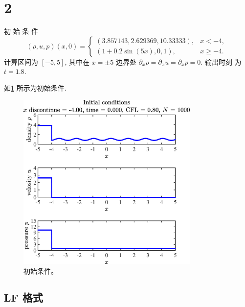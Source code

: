 \documentclass[12pt]{article}
\begin{document}
\section{2}

初 始 条 件
\begin{equation}
	(\rho, u, p)(x, 0)=\left\{\begin{array}{ll}
		(3.857143,2.629369,10.33333), & x<-4,     \\
		(1+0.2 \sin (5 x), 0,1),      & x \geq-4.
	\end{array}\right.
\end{equation}
计算区间为 $[-5,5]$, 其中在 $x=\pm 5$ 边界处 $\partial_{x} \rho=\partial_{x} u=\partial_{x} p=0 .$ 输出时刻 为 $t=1.8$.

如\cref{fig:4ini} 所示为初始条件.

\begin{figure}[htp]
	\centering
	\includegraphics[width=9cm]{4Initial_conditions.eps}
	\vspace{20pt}
	\caption{初始条件。}
	\label{fig:4ini}
\end{figure}


\subsection{LF 格式}
\end{document}
